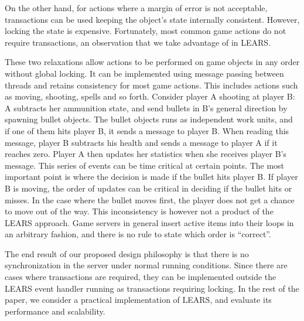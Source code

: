 On the other hand, for actions where a margin of error is not
acceptable, transactions can be used keeping the object's state
internally consistent. However, locking the state is
expensive. Fortunately, most common game actions do not require
transactions, an observation that we take advantage of in LEARS.

These two relaxations allow actions to be performed on game objects in
any order without global locking. It can be implemented using message
passing between threads and retains consistency for most game actions.
This includes actions such as moving, shooting, spells and so forth.
Consider player A shooting at player B: A subtracts her ammunition state, and
send bullets in B's general direction by spawning bullet objects. The
bullet objects runs as independent work units, and if one of them hits player B, it
sends a message to player B. When reading this message, player B
subtracts his health and sends a message to player A if it reaches zero.
Player A then updates her statistics when she receives player B's message. This series of events can be time critical at certain points. The most important point is where the decision is made if the bullet hits player B. If player B is moving, the order of updates can be critical in deciding if the bullet hits or misses. In the case where the bullet moves first, the player does not get a chance to move out of the way. This inconsistency is however not a product of the LEARS approach. Game servers in general insert active items into their loops in an arbitrary fashion, and there is no rule to state which order is ``correct''.

The end result of our proposed design philosophy is that there is no
synchronization in the server under normal running conditions. Since
there are cases where transactions are required, they can be implemented
outside the LEARS event handler running as transactions
requiring locking. In the rest of the paper, we consider a
practical implementation of LEARS, and evaluate its performance and
scalability.
